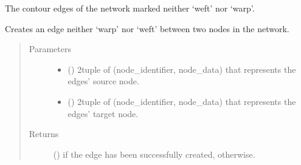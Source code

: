 \documentclass[letterpaper,10pt,english]{sphinxmanual}
\begin{document}
\begin{fulllineitems}
\begin{fulllineitems}
\label{\detokenize{cockatoo:cockatoo.KnitNetworkBase.contour_edges}}
The contour edges of the network marked neither ‘weft’ nor ‘warp’.

\end{fulllineitems}


\begin{fulllineitems}
\label{\detokenize{cockatoo:cockatoo.KnitNetworkBase.create_contour_edge}}
Creates an edge neither ‘warp’ nor ‘weft’ between two nodes in the
network.
\begin{quote}\begin{description}
\item[{Parameters}] \leavevmode\begin{itemize}
\item {} 
 () \textendash{} 2\sphinxhyphen{}tuple of (node\_identifier, node\_data) that represents the edges’
source node.

\item {} 
 () \textendash{} 2\sphinxhyphen{}tuple of (node\_identifier, node\_data) that represents the edges’
target node.

\end{itemize}

\item[{Returns}] \leavevmode
{} () \textendash{}  if the edge has been successfully created,
 otherwise.

\end{description}\end{quote}

\end{fulllineitems}


\end{fulllineitems}
\end{document}
